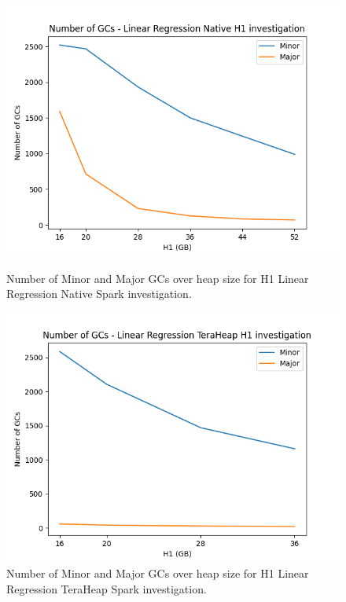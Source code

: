 \iffalse
\begin{figure}[thbp]
	\centering
    \includegraphics[width=\linewidth]{./fig/gcs_linr_h1_native.png}
    \caption{Number of Minor and Major GCs over heap size for H1 Linear Regression Native
    Spark investigation.}
    \label{fig:gcs_linr_h1_native}

    \includegraphics[width=\linewidth]{./fig/gcs_linr_h1_th.png}
    \caption{Number of Minor and Major GCs over heap size for H1 Linear Regression TeraHeap
    Spark investigation.}
    \label{fig:gcs_linr_h1_th}
\end{figure}


